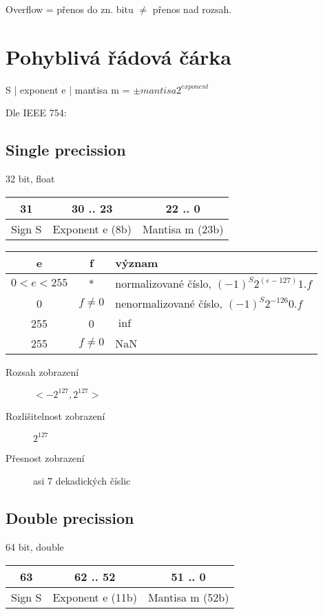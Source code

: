 \documentclass[a4paper, 11pt]{report}
\begin{document}
Overflow = přenos do zn. bitu $\neq$ přenos nad rozsah.

\section{Pohyblivá řádová čárka}

S | exponent e | mantisa m = $\pm mantisa 2^{exponent}$ 

Dle IEEE 754:
\subsection{Single precission}
32 bit, float

\begin{tabular}{| c | c | c |}
	\hline
	31 & 30 .. 23 & 22 .. 0 \\ \hline
	Sign S  & Exponent e (8b) & Mantisa m (23b) \\ \hline
\end{tabular}

\begin{tabular}{| c | c | l |}
	\hline
	e & f & význam \\ \hline
	$0<e<255$ & * & normalizované číslo, $(-1)^S 2^{(e-127)} 1.f$  \\ \hline
	0 & $f \neq 0$ & nenormalizované číslo, $(-1)^S 2^{-126} 0.f$  \\ \hline
	255 & 0 & $\inf$ \\ \hline
	255 & $f \neq 0$ & NaN \\ \hline
\end{tabular}

\begin{description}
	\item[Rozsah zobrazení] $< -2^{127}, 2^{127} >$
	\item[Rozlišitelnost zobrazení] $2^127$
	\item[Přesnost zobrazení] asi 7 dekadických číslic
\end{description}

\subsection{Double precission}
64 bit, double

\begin{tabular}{| c | c | c |}
	\hline
	63 & 62 .. 52 & 51 .. 0 \\ \hline
	Sign S  & Exponent e (11b) & Mantisa m (52b) \\ \hline
\end{tabular}
\end{document}
